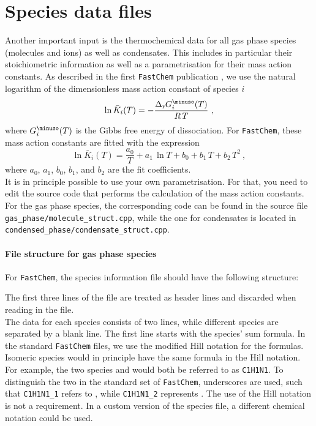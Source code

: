 \documentclass[numbers=noenddot]{aux/fcmanual}
\let\ce\ch
\newcommand{\fc}{\texttt{FastChem}\xspace}
\begin{document}
\section{Species data files}

Another important input is the thermochemical data for all gas phase species (molecules and ions) as well as condensates. This includes in particular their stoichiometric information as well as a parametrisation for their mass action constants. As described in the first \fc publication \citep{Stock2018MNRAS.479..865S}, we use the natural logarithm of the dimensionless mass action constant of species $i$
\begin{equation}
\ln\bar{K}_i(T) = - \frac{\Delta_\mathrm{r} G_i^\minuso(T)}{R\,T} \ ,
\label{eq:lnK}
\end{equation}
where $G_i^\minuso(T)$ is the Gibbs free energy of dissociation. 
For \fc, these mass action constants are fitted with the expression
\begin{equation}
\ln\bar{K}_i(T) = \frac{a_0}{T} + a_1\,\ln T + b_0 + b_1\,T + b_2\,T^2 \ ,
\label{eq:fit}
\end{equation}
where $a_0$, $a_1$, $b_0$, $b_1$, and $b_2$ are the fit coefficients.\\
It is in principle possible to use your own parametrisation. For that, you need to edit the source code that performs the calculation of the mass action constants. For the gas phase species, the corresponding code can be found in the source file \verb|gas_phase/molecule_struct.cpp|, while the one for condensates is located in \verb|condensed_phase/condensate_struct.cpp|.

\paragraph{File structure for gas phase species}
For \fc, the species information file should have the following structure:

The first three lines of the file are treated as header lines and discarded when reading in the file. \\

The data for each species consists of two lines, while different species are separated by a blank line.
The first line starts with the species' sum formula. In the standard \fc files, we use the modified Hill notation for the formulas. Isomeric species would in principle have the same formula in the Hill notation. For example, the two species \ce{HCN} and \ce{HNC} would both be referred to as \texttt{C1H1N1}. To distinguish the two in the standard set of \fc, underscores are used, such that \texttt{C1H1N1\_1} refers to \ce{HCN}, while \texttt{C1H1N1\_2} represents \ce{HNC}.
The use of the Hill notation is not a requirement. In a custom version of the species file, a different chemical notation could be used.\\
\end{document}

